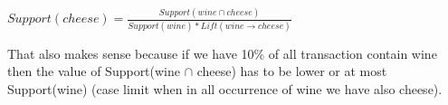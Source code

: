\documentclass[a4paper]{article}
\begin{document}
\begin{center}
	$Support(cheese) = \frac{Support(wine\cap cheese)}{Support(wine) * Lift(wine \rightarrow cheese)}$
\end{center}
That also makes sense because if we have 10\% of all transaction contain wine then the value of Support(wine $\cap$ cheese) has to be lower or at most Support(wine) (case limit when in all occurrence of wine we have also cheese).

\begin{thebibliography}{9}
\end{thebibliography}
\end{document}
